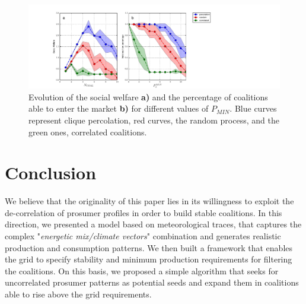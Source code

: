 \documentclass[conference]{IEEEtran}
\begin{document}

\begin{figure}
 \centering
  \includegraphics[scale=0.35]{figure8/fig8.pdf}
  \caption{Evolution of the social welfare \textbf{a)} and the percentage of coalitions able to enter the market \textbf{b)} for different values of $ P_{MIN} $. Blue curves represent clique percolation, red curves, the random process, and the green ones, correlated coalitions.}
 \label{Fig4}
\end{figure}


%
%
\section{Conclusion}
\label{sec:conclusion}

We believe that the originality of this paper lies in its willingness to exploit the de-correlation of prosumer profiles in order to build stable coalitions. In this direction, we presented a model based on meteorological traces, that captures the complex "\textit{energetic mix/climate vectors}" combination and generates realistic production and consumption patterns. We then built a framework that enables the grid to specify stability and minimum production requirements for filtering the coalitions. On this basis, we proposed a simple algorithm that seeks for uncorrelated prosumer patterns as potential seeds and expand them in coalitions able to rise above the grid requirements.
\end{document}
